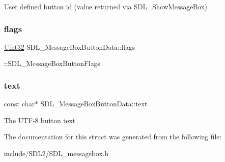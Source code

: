 User defined button id (value returned via S\+D\+L\+\_\+\+Show\+Message\+Box) \mbox{\label{struct_s_d_l___message_box_button_data_a426c8b5da0e718242c7840706d95de0b}} 
\subsubsection{\texorpdfstring{flags}{flags}}
{\footnotesize\ttfamily \hyperlink{_s_d_l__stdinc_8h_add440eff171ea5f55cb00c4a9ab8672d}{Uint32} S\+D\+L\+\_\+\+Message\+Box\+Button\+Data\+::flags}

\+::\+S\+D\+L\+\_\+\+Message\+Box\+Button\+Flags \mbox{\label{struct_s_d_l___message_box_button_data_af35f3062f0577159284c8828caaf08e4}} 
\subsubsection{\texorpdfstring{text}{text}}
{\footnotesize\ttfamily const char$\ast$ S\+D\+L\+\_\+\+Message\+Box\+Button\+Data\+::text}

The U\+T\+F-\/8 button text 

The documentation for this struct was generated from the following file\+:\begin{DoxyCompactItemize}
\item 
include/\+S\+D\+L2/S\+D\+L\+\_\+messagebox.\+h\end{DoxyCompactItemize}
